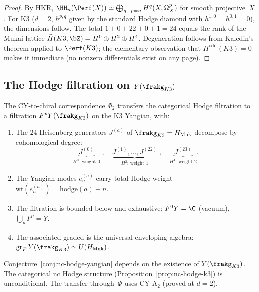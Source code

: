 \begin{proof}
By HKR, $\HH_n(\Perf(X)) \simeq \bigoplus_{q - p = n}
H^q(X, \Omega^p_X)$ for smooth projective~$X$. For K3 ($d = 2$,
$h^{p,q}$ given by the standard Hodge diamond with $h^{1,0} =
h^{0,1} = 0$), the dimensions follow. The total
$1 + 0 + 22 + 0 + 1 = 24$ equals the rank of the Mukai lattice
$\widetilde{H}(K3,\bZ) = H^0 \oplus H^2 \oplus H^4$.
Degeneration follows from Kaledin's theorem applied to
$\Perf(K3)$; the elementary observation that $H^{\mathrm{odd}}
(K3) = 0$ makes it immediate (no nonzero differentials exist on
any page).
\end{proof}

\subsection{The Hodge filtration on \texorpdfstring{$Y(\frakg_{K3})$}{Y(frakg-K3)}}
\label{subsec:nc-hodge-k3-yangian}

\begin{conjecture}
\label{conj:nc-hodge-yangian}
\ClaimStatusConjectured
The CY-to-chiral correspondence $\Phi_2$ transfers the categorical Hodge
filtration to a filtration $F^p Y(\frakg_{K3})$ on the K3 Yangian,
with:
\begin{enumerate}[label=(\roman*)]
 \item The $24$ Heisenberg generators $J^{(a)}$ of
 $\frakg_{K3} = H_{\mathrm{Muk}}$ decompose by cohomological
 degree:
 \[
 \underbrace{J^{(0)}}_{\text{$H^0$: weight } 0}
 \;,\quad
 \underbrace{J^{(1)}, \ldots, J^{(22)}}_{\text{$H^2$: weight } 1}
 \;,\quad
 \underbrace{J^{(23)}}_{\text{$H^4$: weight } 2}.
 \]
 \item The Yangian modes $e_n^{(a)}$ carry total Hodge weight
 $\mathrm{wt}(e_n^{(a)}) = \mathrm{hodge}(a) + n$.
 \item The filtration is bounded below and exhaustive:
 $F^0 Y = \C$ (vacuum), $\bigcup_p F^p = Y$.
 \item The associated graded is the universal enveloping algebra:
 $\mathrm{gr}_F\, Y(\frakg_{K3}) \simeq U(H_{\mathrm{Muk}})$.
\end{enumerate}
\end{conjecture}

\begin{remark}
\label{rem:nc-hodge-conditional}
Conjecture~\ref{conj:nc-hodge-yangian} depends on the existence of
$Y(\frakg_{K3})$. The categorical nc Hodge structure
(Proposition~\ref{prop:nc-hodge-k3}) is unconditional. The transfer
through~$\Phi$ uses CY-A$_2$ (proved at $d = 2$).
\end{remark}

